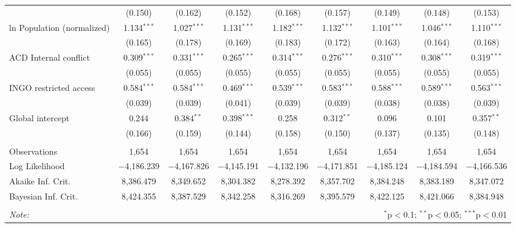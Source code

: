 \begin{sidewaystable}[!htbp]
\begin{tabular}{@{\extracolsep{5pt}}lcccccccc}
  & (0.150) & (0.162) & (0.152) & (0.168) & (0.157) & (0.149) & (0.148) & (0.153) \\ 
  ln Population (normalized) & 1.134$^{***}$ & 1.027$^{***}$ & 1.131$^{***}$ & 1.182$^{***}$ & 1.132$^{***}$ & 1.101$^{***}$ & 1.046$^{***}$ & 1.110$^{***}$ \\ 
  & (0.165) & (0.178) & (0.169) & (0.183) & (0.172) & (0.163) & (0.164) & (0.168) \\ 
  ACD Internal conflict & 0.309$^{***}$ & 0.331$^{***}$ & 0.265$^{***}$ & 0.314$^{***}$ & 0.276$^{***}$ & 0.310$^{***}$ & 0.308$^{***}$ & 0.319$^{***}$ \\ 
  & (0.055) & (0.055) & (0.055) & (0.055) & (0.055) & (0.055) & (0.055) & (0.055) \\ 
  INGO restricted access & 0.584$^{***}$ & 0.584$^{***}$ & 0.469$^{***}$ & 0.539$^{***}$ & 0.583$^{***}$ & 0.588$^{***}$ & 0.589$^{***}$ & 0.563$^{***}$ \\ 
  & (0.039) & (0.039) & (0.041) & (0.039) & (0.039) & (0.038) & (0.038) & (0.039) \\ 
  Global intercept & 0.244 & 0.384$^{**}$ & 0.398$^{***}$ & 0.258 & 0.312$^{**}$ & 0.096 & 0.101 & 0.357$^{**}$ \\ 
  & (0.166) & (0.159) & (0.144) & (0.158) & (0.150) & (0.137) & (0.135) & (0.148) \\ 
 \hline \\[-1.8ex] 
Observations & 1,654 & 1,654 & 1,654 & 1,654 & 1,654 & 1,654 & 1,654 & 1,654 \\ 
Log Likelihood & $-$4,186.239 & $-$4,167.826 & $-$4,145.191 & $-$4,132.196 & $-$4,171.851 & $-$4,185.124 & $-$4,184.594 & $-$4,166.536 \\ 
Akaike Inf. Crit. & 8,386.479 & 8,349.652 & 8,304.382 & 8,278.392 & 8,357.702 & 8,384.248 & 8,383.189 & 8,347.072 \\ 
Bayesian Inf. Crit. & 8,424.355 & 8,387.529 & 8,342.258 & 8,316.269 & 8,395.579 & 8,422.125 & 8,421.066 & 8,384.948 \\ 
\hline 
\hline \\[-1.8ex] 
\textit{Note:}  & \multicolumn{8}{r}{$^{*}$p$<$0.1; $^{**}$p$<$0.05; $^{***}$p$<$0.01} \\ 
\end{tabular} 
\end{sidewaystable} 
